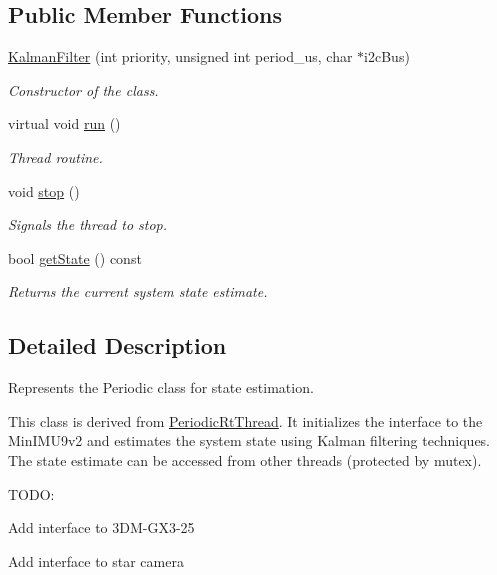 \subsection*{\-Public \-Member \-Functions}
\begin{DoxyCompactItemize}
\item 
\hyperlink{class_u_s_u_1_1_kalman_filter_acbde9bd0fafa0e6c1aa078d392b28a6d}{\-Kalman\-Filter} (int priority, unsigned int period\-\_\-us, char $\ast$i2c\-Bus)
\begin{DoxyCompactList}\small\item\em \-Constructor of the class. \end{DoxyCompactList}\item 
virtual void \hyperlink{class_u_s_u_1_1_kalman_filter_a47cc7f620b57b25133289e61dbf2a7be}{run} ()
\begin{DoxyCompactList}\small\item\em \-Thread routine. \end{DoxyCompactList}\item 
void \hyperlink{class_u_s_u_1_1_kalman_filter_a3f8b3ce719dcb24745150f8c4ef361b8}{stop} ()
\begin{DoxyCompactList}\small\item\em \-Signals the thread to stop. \end{DoxyCompactList}\item 
bool \hyperlink{class_u_s_u_1_1_kalman_filter_ab1259296dd62ed5958f9b3dd88622f73}{get\-State} () const 
\begin{DoxyCompactList}\small\item\em \-Returns the current system state estimate. \end{DoxyCompactList}\end{DoxyCompactItemize}


\subsection{\-Detailed \-Description}
\-Represents the \-Periodic class for state estimation. 

\-This class is derived from \hyperlink{class_u_s_u_1_1_periodic_rt_thread}{\-Periodic\-Rt\-Thread}. \-It initializes the interface to the \-Min\-I\-M\-U9v2 and estimates the system state using \-Kalman filtering techniques. \-The state estimate can be accessed from other threads (protected by mutex).

\-T\-O\-D\-O\-:
\begin{DoxyItemize}
\item \-Add interface to 3\-D\-M-\/\-G\-X3-\/25
\item \-Add interface to star camera 
\end{DoxyItemize}

